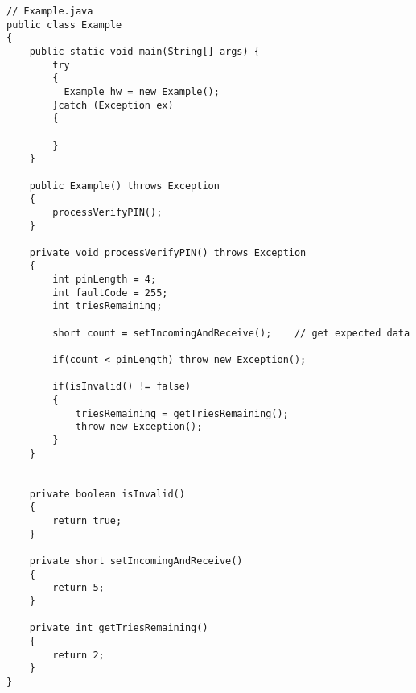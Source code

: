 \label{chap:samples}
\begin{lstlisting}[caption={Mocked Java example code from the Java Card samples},label={lst:example}]
// Example.java
public class Example 
{
    public static void main(String[] args) {
        try
        {
		  Example hw = new Example();
        }catch (Exception ex)
        {

        }
    }

    public Example() throws Exception
    {
        processVerifyPIN();
    }

    private void processVerifyPIN() throws Exception
    {
        int pinLength = 4;
        int faultCode = 255;
        int triesRemaining;

        short count = setIncomingAndReceive();    // get expected data

        if(count < pinLength) throw new Exception();

        if(isInvalid() != false)
        {
            triesRemaining = getTriesRemaining();
            throw new Exception();
        }
    }


    private boolean isInvalid()
    {
        return true;
    }

    private short setIncomingAndReceive()
    {
        return 5;
    }

    private int getTriesRemaining()
    {
        return 2;
    }
}
\end{lstlisting}

\newpage

